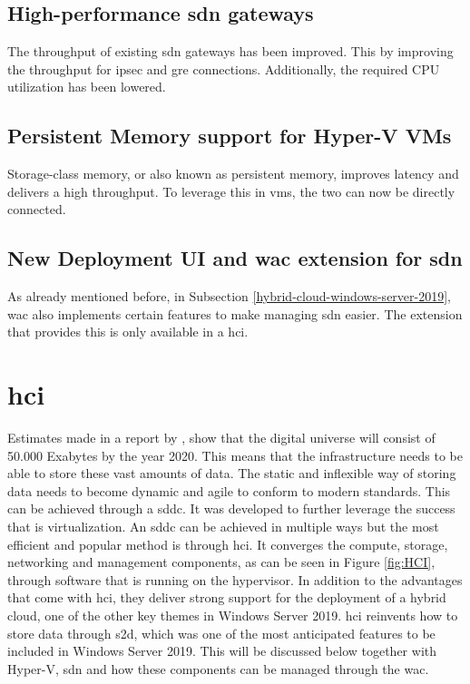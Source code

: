 \subsection*{High-performance \acrshort{sdn} gateways}
The throughput of existing \acrshort{sdn} gateways has been improved. 
This by improving the throughput for \acrfull{ipsec} and \acrfull{gre} connections. 
Additionally, the required CPU utilization has been lowered.
\subsection*{Persistent Memory support for Hyper-V VMs}
Storage-class memory, or also known as persistent memory, improves latency and delivers a high throughput. 
To leverage this in \acrshort{vm}s, the two can now be directly connected.
\subsection*{New Deployment UI and \acrlong{wac} extension for \acrshort{sdn}}
As already mentioned before, in Subsection \ref{hybrid-cloud-windows-server-2019}, \acrlong{wac} also implements certain features to make managing \acrshort{sdn} easier. 
The extension that provides this is only available in a \acrshort{hci}.

\clearpage

\section{\acrfull{hci}}
Estimates made in a report by \textcite{Gantz2012}, show that the digital universe will consist of 50.000 Exabytes by the year 2020. 
This means that the infrastructure needs to be able to store these vast amounts of data. 
The static and inflexible way of storing data needs to become dynamic and agile to conform to modern standards. 
This can be achieved through a \acrfull{sddc}. 
It was developed to further leverage the success that is virtualization. 
An \acrshort{sddc} can be achieved in multiple ways but the most efficient and popular method is through \acrshort{hci}. 
It converges the compute, storage, networking and management components, as can be seen in Figure \ref{fig:HCI}, through software that is running on the hypervisor. 
In addition to the advantages that come with \acrshort{hci}, they deliver strong support for the deployment of a hybrid cloud, one of the other key themes in Windows Server 2019. 
\acrshort{hci} reinvents how to store data through \acrshort{s2d}, which was one of the most anticipated features to be included in Windows Server 2019. 
This will be discussed below together with Hyper-V, \acrshort{sdn} and how these components can be managed through the \acrlong{wac}. \autocite{Haag2016}

